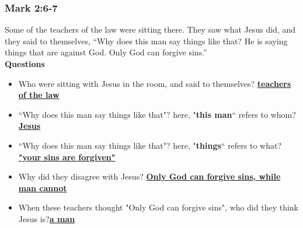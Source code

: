 \newpage
\vspace{.3cm}
\subsubsection{\large{Mark 2:6-7}}
Some of the teachers of the law were sitting there. They saw what Jesus did, and they said to themselves, “Why does this man say things like that? He is saying things that are against God. Only God can forgive sins.” \\
\vspace{.2cm}
\textbf{Questions}\vspace{-.5cm}
\begin{itemize}[noitemsep]
\item Who were sitting with Jesus in the room, and said to themselves? \textbf{\underline{ teachers of the law}}
\item“Why does this man say things like that"? here, "\textbf{this man}“ refers to whom? \textbf{\underline{ Jesus}}
\item“Why does this man say things like that"? here, "\textbf{things}“ refers to what? \textbf{\underline{ "your sins are forgiven"}}
\item Why did they disagree with Jesus? \textbf{\underline{Only God can forgive sins, while man cannot}}
\item When these teachers thought "Only God can forgive sins", who did they think Jesus is?\textbf{\underline{a man}}
\end{itemize}


\vspace{.3cm}

